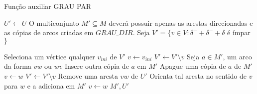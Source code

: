     \begin{algorithm}
        \caption{Função auxiliar GRAU PAR}
        \label{mixed-grau-par}
        \begin{algorithmic}[1]
                \State $U' \gets U$
                \State O multiconjunto $M' \subseteq M$ deverá possuir apenas as arestas direcionadas e as cópias de arcos criadas em $GRAU\_DIR$.
                \State Seja $V' = \{v \in V : \delta^+ + \delta^- + \delta$ é ímpar $\}$

                    \State Seleciona um vértice qualquer $v_{ini}$ de $V'$ 
                    \State $v \gets v_{ini}$
                        \State $V' \gets V' \setminus v$
                        \Repeat 
                            \State Seja $a \in M'$, um arco da forma $vw$ ou $wv$
                                \State Insere outra cópia de $a$ em $M'$ \label{alg:duplica}
                            \Else
                                \State Apague uma cópia de $a$ de $M'$ \label{alg:deleta}
                            \EndIf
                            \State $v \gets w$
                        \State $V' \gets V' \setminus v$
                        \Repeat
                            \State Remove uma aresta $vw$ de $U'$
                            \State Orienta tal aresta no sentido de $v$ para $w$ e a adiciona em $M'$ \label{alg:orienta}
                            \State $v \gets w$
                    \EndWhile
                \EndWhile
                \Return $M', U'$
            \EndFunction
        \end{algorithmic}
    \end{algorithm}

